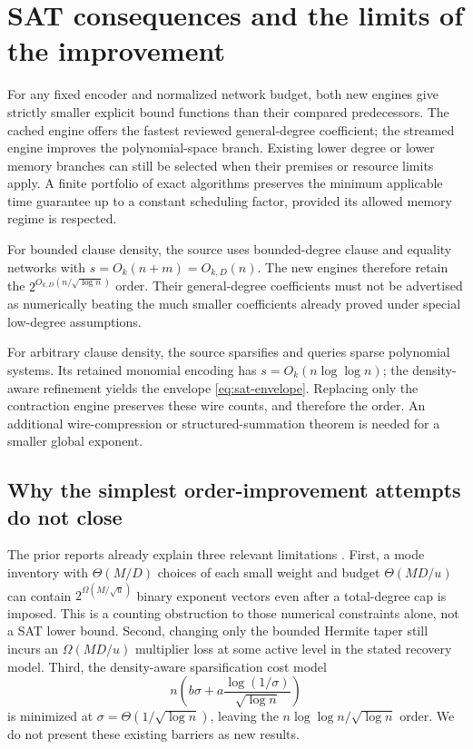 \documentclass[11pt,letterpaper]{article}
\theoremstyle{remark}\newtheorem{remark}[theorem]{Remark}
\begin{document}
\section{SAT consequences and the limits of the improvement}
\label{sec:sat}

For any fixed encoder and normalized network budget, both new engines give
strictly smaller explicit bound functions than their compared predecessors.
The cached engine offers the fastest reviewed general-degree coefficient;
the streamed engine improves the polynomial-space branch. Existing lower
degree or lower memory branches can still be selected when their premises
or resource limits apply. A finite portfolio of exact algorithms preserves
the minimum applicable time guarantee up to a constant scheduling factor,
provided its allowed memory regime is respected.

For bounded clause density, the source uses bounded-degree clause and
equality networks with $s=O_k(n+m)=O_{k,D}(n)$. The new engines therefore
retain the $2^{O_{k,D}(n/\sqrt{\log n})}$ order. Their general-degree
coefficients must not be advertised as numerically beating the much smaller
coefficients already proved under special low-degree assumptions.

For arbitrary clause density, the source sparsifies and queries sparse
polynomial systems. Its retained monomial encoding has
$s=O_k(n\log\log n)$; the density-aware refinement yields the envelope
\eqref{eq:sat-envelope}. Replacing only the contraction engine preserves
these wire counts, and therefore the order. An additional wire-compression
or structured-summation theorem is needed for a smaller global exponent.

\subsection{Why the simplest order-improvement attempts do not close}

The prior reports already explain three relevant limitations
\cite{precision,barriers,density}. First, a mode inventory with
$\Theta(M/D)$ choices of each small weight and budget $\Theta(MD/u)$
can contain $2^{\Omega(M/\sqrt u)}$ binary exponent vectors even after a
total-degree cap is imposed. This is a counting obstruction to those
numerical constraints alone, not a SAT lower bound. Second, changing only
the bounded Hermite taper still incurs an $\Omega(MD/u)$ multiplier loss
at some active level in the stated recovery model. Third, the density-aware
sparsification cost model
\[
 n\left(b\sigma+a\frac{\log(1/\sigma)}{\sqrt{\log n}}\right)
\]
is minimized at $\sigma=\Theta(1/\sqrt{\log n})$, leaving the
$n\log\log n/\sqrt{\log n}$ order. We do not present these existing
barriers as new results.
\end{document}
